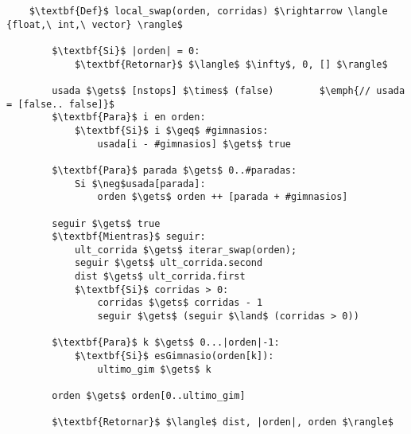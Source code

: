     \begin{lstlisting}
    $\textbf{Def}$ local_swap(orden, corridas) $\rightarrow \langle {float,\ int,\ vector} \rangle$

        $\textbf{Si}$ |orden| = 0:
            $\textbf{Retornar}$ $\langle$ $\infty$, 0, [] $\rangle$

        usada $\gets$ [nstops] $\times$ (false)        $\emph{// usada = [false.. false]}$
        $\textbf{Para}$ i en orden:
            $\textbf{Si}$ i $\geq$ #gimnasios:
                usada[i - #gimnasios] $\gets$ true

        $\textbf{Para}$ parada $\gets$ 0..#paradas:
            Si $\neg$usada[parada]:
                orden $\gets$ orden ++ [parada + #gimnasios]

        seguir $\gets$ true
        $\textbf{Mientras}$ seguir:
            ult_corrida $\gets$ iterar_swap(orden);
            seguir $\gets$ ult_corrida.second
            dist $\gets$ ult_corrida.first
            $\textbf{Si}$ corridas > 0:
                corridas $\gets$ corridas - 1
                seguir $\gets$ (seguir $\land$ (corridas > 0))

        $\textbf{Para}$ k $\gets$ 0...|orden|-1:
            $\textbf{Si}$ esGimnasio(orden[k]):
                ultimo_gim $\gets$ k

        orden $\gets$ orden[0..ultimo_gim]

        $\textbf{Retornar}$ $\langle$ dist, |orden|, orden $\rangle$
    \end{lstlisting}
